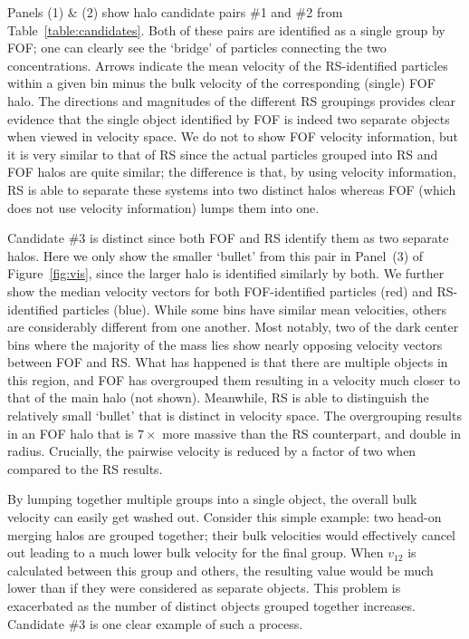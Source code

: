 \documentclass[useAMS, usenatbib]{mn2e}
\newcommand{\vonetwo}{v_{12}}
\begin{document}
Panels (1) \& (2) show halo candidate pairs \#1 and \#2 from
Table~\ref{table:candidates}.  Both of these pairs are identified
as a single group by FOF; one can clearly see the `bridge' of
particles connecting the two concentrations.  Arrows indicate the
mean velocity of the RS-identified particles within a given bin
minus the bulk velocity of the corresponding (single) FOF halo.
The directions and magnitudes of the different RS groupings provides
clear evidence that the single object identified by FOF is indeed
two separate objects when viewed in velocity space.  We do not to
show FOF velocity information, but it is very similar to that of
RS since the actual particles grouped into RS and FOF halos are
quite similar; the difference is that, by using velocity information,
RS is able to separate these systems into two distinct halos whereas
FOF (which does not use velocity information) lumps them into one.

Candidate \#3 is distinct since both FOF and RS identify them as
two separate halos.  Here we only show the smaller `bullet' from
this pair in Panel~(3) of Figure~\ref{fig:vis}, since the larger
halo is identified similarly by both.  We further show the median velocity
vectors for both FOF-identified particles (red) and RS-identified
particles (blue).  While some bins have similar mean velocities,
others are considerably different from one another.  Most notably,
two of the dark center bins where the majority of the mass lies
show nearly opposing velocity vectors between FOF and RS.  What has
happened is that there are multiple objects in this region, and FOF
has overgrouped them resulting in a velocity much closer to that
of the main halo (not shown).  Meanwhile, RS is able to distinguish
the relatively small `bullet' that is distinct in velocity space.
The overgrouping results in an FOF halo that is $7\times$ more
massive than the RS counterpart, and double in radius.  Crucially,
the pairwise velocity is reduced by a factor of two when compared
to the RS results.

By lumping together multiple groups into a single object, the overall bulk
velocity can easily get washed out.  Consider this simple example:
two head-on merging halos are grouped together; their bulk
velocities would effectively cancel out leading to a much lower bulk
velocity for the final group.  When $\vonetwo$ is calculated between
this group and others, the resulting value would be much lower than if they were considered as separate objects.
This problem is exacerbated as the number of distinct objects grouped
together increases.  
Candidate \#3 is one clear example of such a process.
\end{document}
